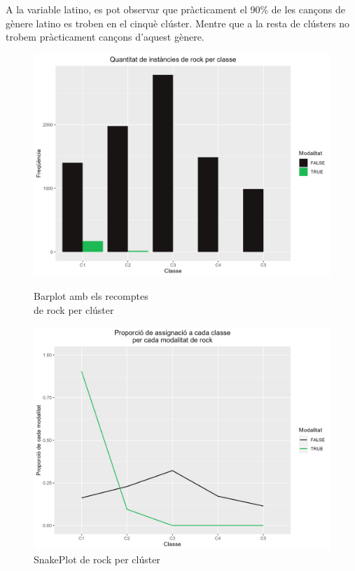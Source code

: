 A la variable latino, es pot observar que pràcticament el 90\% de les cançons de gènere latino es troben en el cinquè clúster. Mentre que a la resta de clústers no trobem pràcticament cançons d'aquest gènere.

\begin{figure}[H]
\centering
    \begin{minipage}{.49\textwidth}
        \centering
        \includegraphics[width=0.95\linewidth]{Images/5_Profiling/categoriques/cat/Cat_BarPlot_rock.png}
        \caption{Barplot amb els recomptes \\ de rock per clúster}
        \label{fig:Cat_BarPlot_rock}
    \end{minipage}%
    \begin{minipage}{.49\textwidth}
        \centering
        \includegraphics[width=0.95\linewidth]{Images/5_Profiling/categoriques/cat/Cat_SnakePlot_rock.png}
        \caption{SnakePlot de rock per clúster}
        \label{fig:Cat_SnakePlot_rock}
    \end{minipage}%
\end{figure}

